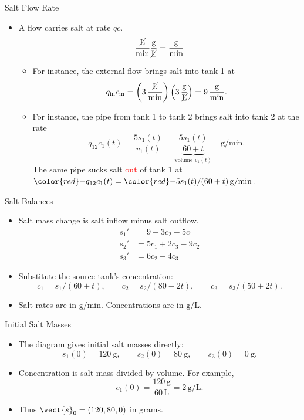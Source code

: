 \begin{frame}{Salt Flow Rate}
\begin{itemize}
  \item A flow carries salt at rate $qc$.
  \[
    \frac{\cancel{\mathrm L}}{\mathrm{min}}
    \frac{\mathrm g}{\cancel{\mathrm L}}=\frac{\mathrm g}{\mathrm{min}}
  \]
  \begin{itemize}
    \item For instance, the external flow brings salt into tank 1 at
    \[
      q_{\mathrm{in}}c_{\mathrm{in}}
      =\left(3\,\frac{\cancel{\mathrm L}}{\mathrm{min}}\right)
       \left(3\,\frac{\mathrm g}{\cancel{\mathrm L}}\right)
      =9\,\frac{\mathrm g}{\mathrm{min}}.
    \]
    \item For instance, the pipe from tank 1 to tank 2 brings salt into tank 2 at the rate
    \[
      q_{12}c_1(t)=\frac{5s_1(t)}{v_1(t)}
      =\frac{5s_1(t)}{\underbrace{60+t}_{\text{volume }v_1(t)}}
      \quad\mathrm{g/min}.
    \]
    The same pipe sucks salt \textcolor{red}{out} of tank 1 at 
    $ {\color{red}-}q_{12}c_1(t)={\color{red}-}5s_1(t)/(60+t)\,\mathrm{g/min}$.
  \end{itemize}
\end{itemize}
\end{frame}
\begin{frame}{Salt Balances}
\begin{itemize}
  \item Salt mass change is salt inflow minus salt outflow.
  \[
  \begin{aligned}
    s_1'&=9+3c_2-5c_1\\[4pt]
    s_2'&=5c_1+2c_3-9c_2\\[4pt]
    s_3'&=6c_2-4c_3
  \end{aligned}
  \]
  \item Substitute the source tank's concentration:
  \[
    c_1=s_1/(60+t),\qquad
    c_2=s_2/(80-2t),\qquad
    c_3=s_3/(50+2t).
  \]
  \item Salt rates are in $\mathrm{g/min}$. Concentrations are in $\mathrm{g/L}$.
\end{itemize}
\end{frame}

\begin{frame}{Initial Salt Masses}
\begin{itemize}
  \item The diagram gives initial salt masses directly:
  \[
    s_1(0)=120\ \mathrm g,\qquad s_2(0)=80\ \mathrm g,\qquad s_3(0)=0\ \mathrm g.
  \]
  \item Concentration is salt mass divided by volume. For example,
  \[
    c_1(0)=\frac{120\,\mathrm g}{60\,\mathrm L}=2\,\mathrm{g/L}.
  \]
  \item Thus $\vect{s}_0=(120,80,0)$ in grams.
\end{itemize}
\end{frame}

